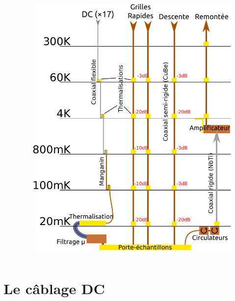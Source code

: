 \documentclass[8pt,a9paper]{beamer} \usepackage[utf8]{inputenc} \usepackage[francais]{babel} \usepackage[T1]{fontenc}
\begin{document}
\begin{frame}
\begin{columns}[T]
\begin{column}{0.6\textwidth}
    \end{column}
    \begin{column}{0.4\textwidth}
        \begin{figure}[H]
            \includegraphics[width=\textwidth]{Images/Cablage_schema}
        \end{figure}
    \end{column}
    \end{columns}
\end{frame}
\section{Le câblage DC}
\end{document}
